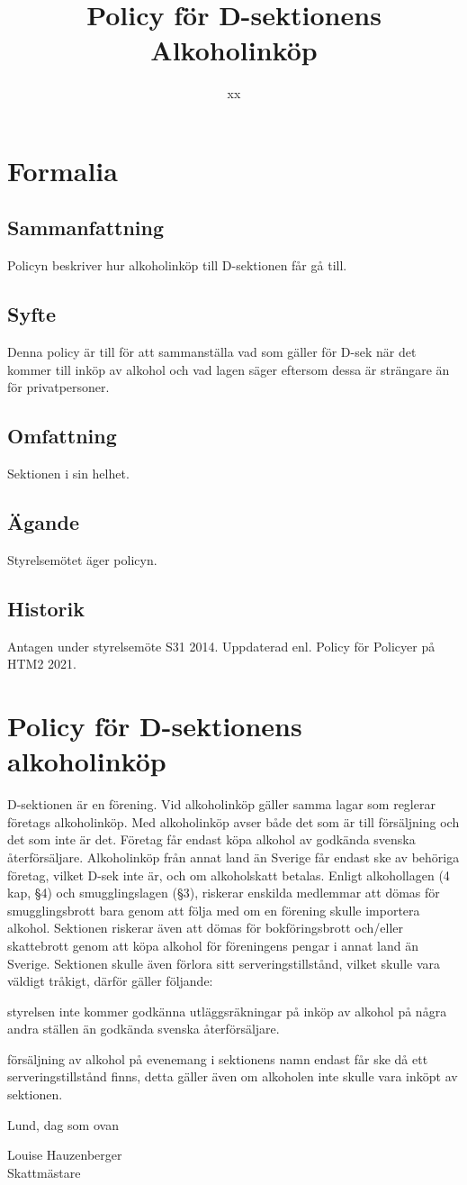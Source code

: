 \documentclass{dsekprotokoll}
\title{Policy för D-sektionens Alkoholinköp}
\author{xx}
\begin{document}
\section{Formalia}
\subsection{Sammanfattning}
Policyn beskriver hur alkoholinköp till D-sektionen får gå till.
\subsection{Syfte}
Denna policy är till för att sammanställa vad som gäller för D-sek när
det kommer till inköp av alkohol och vad lagen säger eftersom dessa är strängare än för privatpersoner.
\subsection{Omfattning}
Sektionen i sin helhet.
\subsection{Ägande}
Styrelsemötet äger policyn.
\subsection{Historik}
Antagen under styrelsemöte S31 2014.
Uppdaterad enl. Policy för Policyer på HTM2 2021.
\section{Policy för D-sektionens alkoholinköp}

D-sektionen är en förening. Vid alkoholinköp gäller samma lagar som reglerar
företags alkoholinköp. Med alkoholinköp avser både det som är till försäljning och det som inte är det.
Företag får endast köpa alkohol av godkända svenska återförsäljare. Alkoholinköp från annat
land än Sverige får endast ske av behöriga företag, vilket D-sek inte är, och om alkoholskatt
betalas. Enligt alkohollagen (4 kap, §4) och smugglingslagen (§3), riskerar enskilda medlemmar att dömas för smugglingsbrott bara genom att följa med om en förening skulle importera
alkohol. Sektionen riskerar även att dömas för bokföringsbrott och/eller skattebrott genom att
köpa alkohol för föreningens pengar i annat land än Sverige. Sektionen skulle även förlora sitt
serveringstillstånd, vilket skulle vara väldigt tråkigt, därför gäller följande:
\begin{attlista}
	\item styrelsen inte kommer godkänna utläggsräkningar på inköp av alkohol på några andra ställen än godkända svenska återförsäljare.
	\item försäljning av alkohol på evenemang i sektionens namn endast får ske då ett serveringstillstånd finns, detta gäller även om alkoholen inte skulle vara inköpt av sektionen.

\end{attlista}



Lund, dag som ovan\newline

Louise Hauzenberger\\
Skattmästare
\end{document}
